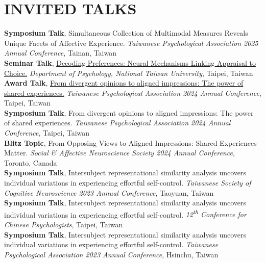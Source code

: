 \documentclass[a4paper,12pt]{article}
\newcommand{\sectionspace}{0pt} %
\newcommand{\itemspace}{7pt} %
\begin{document}
\vspace{\sectionspace}

\section*{INVITED TALKS}
\textbf{Symposium Talk}, Simultaneous Collection of Multimodal Measures Reveals Unique Facets of Affective Experience. \textit{Taiwanese Psychological Association 2025 Annual Conference}, Tainan, Taiwan \\[\itemspace]
\textbf{Seminar Talk}, \href{http://www.psy.ntu.edu.tw/index.php/homepage/speech/2903-1131127}{Decoding Preferences: Neural Mechanisms Linking Appraisal to Choice.} \textit{Department of Psychology, National Taiwan University}, Taipei, Taiwan \\[\itemspace]
\textbf{Award Talk}, \href{https://github.com/Ben-FCC/Ben-FCC_CV/blob/main/assets/2024_TPA_Oral.pdf}{From divergent opinions to aligned impressions: The power of shared experiences.}  \textit{Taiwanese Psychological Association 2024 Annual Conference}, Taipei, Taiwan \\[\itemspace]
\textbf{Symposium Talk}, From divergent opinions to aligned impressions: The power of shared experiences.  \textit{Taiwanese Psychological Association 2024 Annual Conference}, Taipei, Taiwan \\[\itemspace]
\textbf{Blitz Topic},  From Opposing Views to Aligned Impressions: Shared Experiences Matter.  \textit{Social \& Affective Neuroscience Society 2024 Annual Conference}, Toronto, Canada \\[\itemspace]
\textbf{Symposium Talk}, Intersubject representational similarity analysis uncovers individual variations in experiencing effortful self-control. \textit{Taiwanese Society of Cognitive Neuroscience 2023 Annual Conference}, Taoyuan, Taiwan \\[\itemspace]
\textbf{Symposium Talk}, Intersubject representational similarity analysis uncovers individual variations in experiencing effortful self-control.  \textit{12\textsuperscript{th} Conference for Chinese Psychologists}, Taipei, Taiwan \\[\itemspace]
\textbf{Symposium Talk}, Intersubject representational similarity analysis uncovers individual variations in experiencing effortful self-control.  \textit{Taiwanese Psychological Association 2023 Annual Conference}, Hsinchu, Taiwan \\[\itemspace]

\vspace{\sectionspace}
\end{document}
